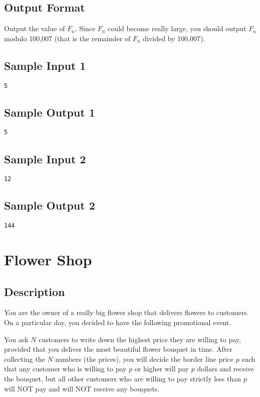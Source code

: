 \subsection*{Output Format}
Output the value of $F_n$.  Since $F_n$ could become really large, you should output $F_n$ modulo 100,007 (that is the remainder of $F_n$ divided by 100,007).

\subsection*{Sample Input 1}
\begin{verbatim}
5
\end{verbatim}
\subsection*{Sample Output 1}
\begin{verbatim}
5
\end{verbatim}

\subsection*{Sample Input 2}
\begin{verbatim}
12
\end{verbatim}
\subsection*{Sample Output 2}
\begin{verbatim}
144
\end{verbatim}






\newpage

\section{Flower Shop}
\subsection*{Description}
You are the owner of a really big flower shop that delivers flowers to customers.  On a particular day, you decided to have the following promotional event.  

You ask $N$ customers to write down the highest price they are willing to pay, provided that you deliver the most beautiful flower bouquet in time.  After collecting the $N$ numbers (the prices), you will decide the border line price $p$ such that any customer who is willing to pay $p$ or higher will pay $p$ dollars and receive the bouquet, but all other customers who are willing to pay strictly less than $p$ will NOT pay and will NOT receive any bouquets. 

